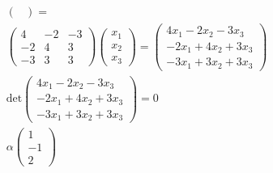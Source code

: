 \begin{enumerate}
\begin{gather*}
\begin{pmatrix}
				\end{pmatrix}
				=\\
				\begin{pmatrix}
					4 & -2 & -3 \\
					-2 & 4 & 3 \\
					-3 & 3 & 3
				\end{pmatrix}
				\begin{pmatrix}
					x_1 \\ x_2 \\ x_3
				\end{pmatrix}
				=
				\begin{pmatrix}
					4x_1 -2x_2 -3x_3 \\
					-2x_1 +4x_2 +3x_3 \\
					-3x_1 + 3x_2 +3x_3
				\end{pmatrix}
				\\
				\text{det}
				\begin{pmatrix}
					4x_1 -2x_2 -3x_3 \\
					-2x_1 +4x_2 +3x_3 \\
					-3x_1 + 3x_2 +3x_3
				\end{pmatrix}
				= 0
				\\
				\alpha
				\begin{pmatrix}
					1\\-1\\2
				\end{pmatrix}
			\end{gather*}
		\end{enumerate}
		
		
